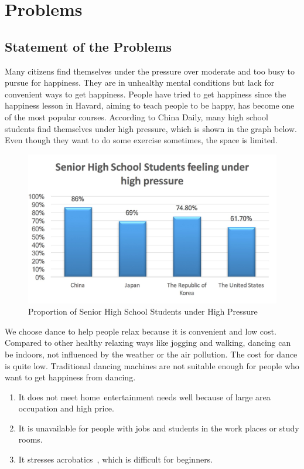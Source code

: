\section{Problems}

\subsection{Statement of the Problems}

Many citizens find themselves under the pressure over moderate and too busy to
pursue for happiness. They are in unhealthy mental conditions but lack for
convenient ways to get happiness. People have tried to get happiness since the
happiness lesson in Havard, aiming to teach people to be happy, has become one
of the most popular courses. According to China Daily, many high school students
find themselves under high pressure, which is shown in the graph below. Even
though they want to do some exercise sometimes, the space is limited. 

\begin{figure}[H]
    \centering
    \includegraphics[width=13cm]{Pics/Problems1}
    \caption{Proportion of Senior High School Students under High Pressure}
\end{figure}

We choose dance to help people relax because it is convenient and low cost.
Compared to other healthy relaxing ways like jogging and walking, dancing can be
indoors, not influenced by the weather or the air pollution. The cost for dance
is quite low.  
Traditional dancing machines are not suitable enough for people who want to get
happiness from dancing. 

\begin{enumerate}[\hspace{2em} 1.]
    \item It does not meet home entertainment needs well because of large area
      occupation and high price. 
    \item It is unavailable for people with jobs and students in the work places
      or study rooms. 
    \item It stresses acrobatics , which is difficult for beginners. 
\end{enumerate}

